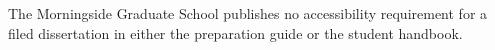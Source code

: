 



	{The Morningside Graduate School publishes no accessibility requirement for
	 a filed dissertation in either the preparation guide or the student
	 handbook.}

\newcommand{\thesis@umc@dean}{Mary Ellen Lane, Ph.D.}
\newcommand{\umasschandean}[1]{\renewcommand{\thesis@umc@dean}{#1}}

